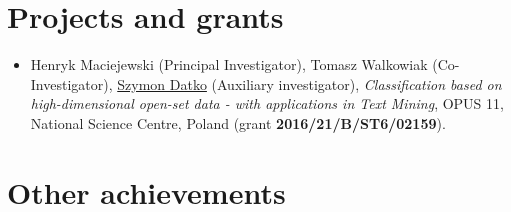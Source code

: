 \section{Projects and grants}

\begin{itemize}
    \item
        Henryk Maciejewski (Principal Investigator), Tomasz Walkowiak (Co-Investigator), \underline{Szymon Datko} (Auxiliary investigator),
        \textit{Classification based on high-dimensional open-set data - with applications in Text
Mining},
        OPUS 11, National Science Centre, Poland (grant \textbf{2016/21/B/ST6/02159}).
\end{itemize}


\section{Other achievements}

